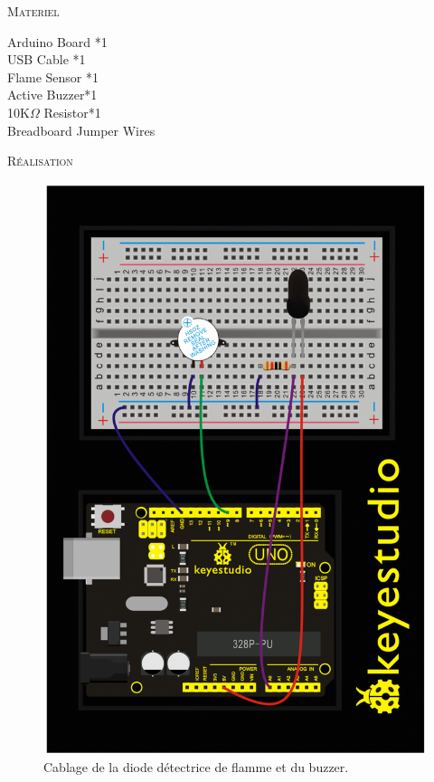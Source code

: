 \documentclass[a4paper, 11pt]{article}           %
\newcommand{\partie}[1]{\textsc{\LARGE #1} }
\begin{document}
\partie{Materiel}                         %
\begin{multicols}{2}
	Arduino Board *1\\
	USB Cable *1\\
	Flame Sensor *1 \\
	Active Buzzer*1\\
	10K$\Omega$ Resistor*1\\
	Breadboard Jumper Wires\\
\end{multicols}


\bigskip

\partie{Réalisation} \\                      %
\begin{figure}[p]
\begin{center}
\includegraphics[height=0.9\textheight]{cablage}
\caption{Cablage de la diode détectrice de flamme et du buzzer.}
\label{FigDiodeFlamme}
\end{center}
\end{figure}
\end{document}
